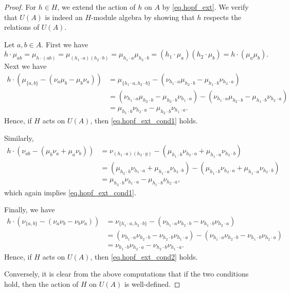 \documentclass[reqno]{amsart}
\numberwithin{equation}{section}
\theoremstyle{definition}
\begin{document}
\begin{proof}
For $h \in H$, we extend the action of $h$ on $A$ by \eqref{eq.hopf_ext}.
We verify that $U(A)$ is indeed an $H$-module algebra by showing that $h$ respects the relations of $U(A)$.

Let $a,b \in A$. First we have
\[
h \cdot \mu_{ab}
	= \mu_{h \cdot (ab)} 
 = \mu_{(h_1 \cdot a)(h_2 \cdot b)} 
    =  \mu_{h_1 \cdot a} \mu_{h_2 \cdot b}
    = (h_1 \cdot \mu_a) (h_2 \cdot \mu_b)
    = h \cdot (\mu_a \mu_b).
\]
Next we have
\begin{align*}
h \cdot \left(\mu_{\{a,b\}} - ( \nu_a\mu_b-\mu_b\nu_a ) \right)
    &= \mu_{\{h_1 \cdot a, h_2 \cdot b\}} - (\nu_{h_1 \cdot a}\mu_{h_2 \cdot b} - \mu_{h_1 \cdot b}\nu_{h_2\cdot a}) \\
    &= (\nu_{h_1 \cdot a} \mu_{h_2 \cdot b} - \mu_{h_2 \cdot b} \nu_{h_1 \cdot a}) - (\nu_{h_1 \cdot a}\mu_{h_2 \cdot b} - \mu_{h_1 \cdot b}\nu_{h_2\cdot a}) \\
    &= \mu_{h_1 \cdot b}\nu_{h_2 \cdot a} - \mu_{h_2 \cdot b} \nu_{h_1 \cdot a}.
\end{align*}
Hence, if $H$ acts on $U(A)$, then \eqref{eq.hopf_ext_cond1} holds.

Similarly,
\begin{align*}
h \cdot \left(\nu_{ab} - (\mu_b \nu_a + \mu_a \nu_b)\right)
    &= \nu_{(h_1 \cdot a)(h_2 \cdot y)} - (\mu_{h_1 \cdot b} \nu_{h_2 \cdot a} + \mu_{h_1 \cdot a} \nu_{h_2 \cdot b}) \\
    &= (\mu_{h_2 \cdot b} \nu_{h_1 \cdot a} + \mu_{h_1 \cdot a} \nu_{h_2 \cdot b}) - (\mu_{h_1 \cdot b} \nu_{h_2 \cdot a} + \mu_{h_1 \cdot a} \nu_{h_2 \cdot b}) \\
    &= \mu_{h_2 \cdot b} \nu_{h_1 \cdot a}  - \mu_{h_1 \cdot b} \nu_{h_2 \cdot a},
\end{align*}
which again implies \eqref{eq.hopf_ext_cond1}.

Finally, we have
\begin{align*}
h \cdot \left(\nu_{\{a,b\}} - (\nu_a \nu_b - \nu_b \nu_a) \right) 
    &= \nu_{ \{h_1 \cdot a, h_2 \cdot b\} } - (\nu_{h_1 \cdot a} \nu_{h_2 \cdot b} - \nu_{h_1 \cdot b}\nu_{h_2 \cdot a}) \\
    &= (\nu_{h_1 \cdot a} \nu_{h_2 \cdot b} - \nu_{h_2 \cdot b}\nu_{h_1 \cdot a}) - (\nu_{h_1 \cdot a} \nu_{h_2 \cdot b} - \nu_{h_1 \cdot b}\nu_{h_2 \cdot a}) \\
    &= \nu_{h_1 \cdot b}\nu_{h_2 \cdot a} - \nu_{h_2 \cdot b}\nu_{h_1 \cdot a}.
\end{align*}
Hence, if $H$ acts on $U(A)$, then \eqref{eq.hopf_ext_cond2} holds.

Conversely, it is clear from the above computations that if the two conditions hold, then the action of $H$ on $U(A)$ is well-defined.
\end{proof}
\end{document}
